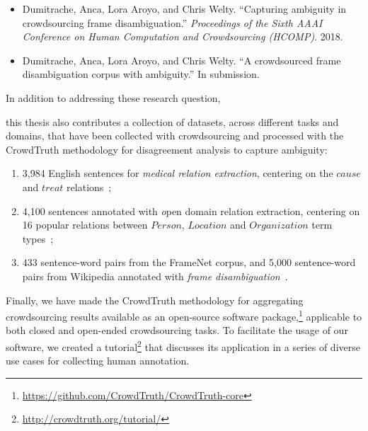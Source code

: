 \begin{itemize}
    \begin{itemize}
        \item Dumitrache, Anca, Lora Aroyo, and Chris Welty. ``Capturing ambiguity in crowdsourcing frame disambiguation.'' \textit{Proceedings of the Sixth AAAI Conference on Human Computation and Crowdsourcing (HCOMP)}. 2018.~\cite{DBLP:conf/hcomp/DumitracheAW18}
        \item Dumitrache, Anca, Lora Aroyo, and Chris Welty. ``A crowdsourced frame disambiguation corpus with ambiguity.'' In submission.
    \end{itemize}
\end{itemize}

In addition to addressing these research question, {\color{blue} this thesis also contributes a collection of datasets, across different tasks and domains, that have been collected with crowdsourcing and processed with the CrowdTruth methodology for disagreement analysis to capture ambiguity:

\begin{enumerate}
    \item 3,984 English sentences for \textit{medical relation extraction}, centering on the $cause$ and $treat$ relations~\cite{anca_dumitrache_2016_50676};
    
    \item 4,100 sentences annotated with {\textit open domain relation extraction}, centering on 16 popular relations between $Person$, $Location$ and $Organization$ term types~\cite{crowdODrelexdata2016};
    
    \item 433 sentence-word pairs from the FrameNet corpus, and 5,000 sentence-word pairs from Wikipedia annotated with \textit{frame disambiguation}~\cite{anca_dumitrache_2018_1472345}.
\end{enumerate}

Finally, we have made the CrowdTruth methodology for aggregating crowdsourcing results available as an open-source software package,\footnote{\url{https://github.com/CrowdTruth/CrowdTruth-core}
} applicable to both closed and open-ended crowdsourcing tasks. To facilitate the usage of our software, we created a tutorial\footnote{\url{http://crowdtruth.org/tutorial/}} that discusses its application in a series of diverse use cases for collecting human annotation.
}



